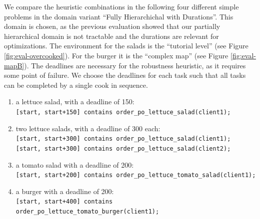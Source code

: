 We compare the heuristic combinations in the following four different simple problems in the domain variant ``Fully Hierarchichal with Durations''.
This domain is chosen, as the previous evaluation showed that our partially hierarchical domain is not tractable and the durations are relevant for optimizations.
The environment for the salads is the ``tutorial level'' (see Figure \ref{fig:eval-overcooked}).
For the burger it is the ``complex map'' (see Figure \ref{fig:eval-mapB}).
The deadlines are necessary for the robustness heuristic, as it requires some point of failure.
We choose the deadlines for each task such that all tasks can be completed by a single cook in sequence.
\begin{enumerate}
  \item a lettuce salad, with a deadline of 150:\\ 
    \verb|[start, start+150] contains order_po_lettuce_salad(client1);|
  \item two lettuce salads, with a deadline of 300 each:\\
    \verb|[start, start+300] contains order_po_lettuce_salad(client1);|\\
    \verb|[start, start+300] contains order_po_lettuce_salad(client2);|\\
  \item a tomato salad with a deadline of 200:\\
    \verb|[start, start+200] contains order_po_lettuce_tomato_salad(client1);|
  \item a burger with a deadline of 200:\\
    \verb|[start, start+400] contains order_po_lettuce_tomato_burger(client1);|
\end{enumerate}

